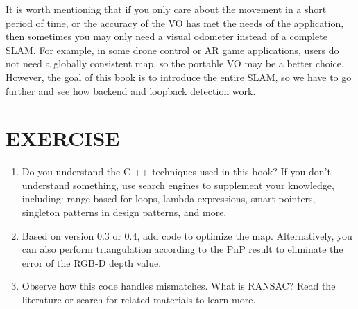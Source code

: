 It is worth mentioning that if you only care about the movement in a short period of time, or the accuracy of the VO has met the needs of the application, then sometimes you may only need a visual odometer instead of a complete SLAM. For example, in some drone control or AR game applications, users do not need a globally consistent map, so the portable VO may be a better choice. However, the goal of this book is to introduce the entire SLAM, so we have to go further and see how backend and loopback detection work.

\section*{EXERCISE}
\begin{enumerate}
\item Do you understand the C ++ techniques used in this book? If you don't understand something, use search engines to supplement your knowledge, including: range-based for loops, lambda expressions, smart pointers, singleton patterns in design patterns, and more.
\item Based on version 0.3 or 0.4, add code to optimize the map. Alternatively, you can also perform triangulation according to the PnP result to eliminate the error of the RGB-D depth value.
\item Observe how this code handles mismatches. What is RANSAC? Read the literature \cite{wiki:RANSAC} or search for related materials to learn more.
\end{enumerate}
